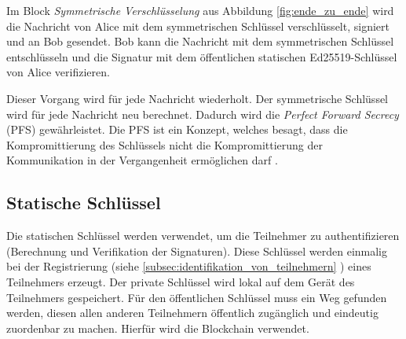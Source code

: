 Im Block \textit{Symmetrische Verschlüsselung} aus Abbildung \ref{fig:ende_zu_ende} wird die Nachricht von Alice mit dem symmetrischen Schlüssel verschlüsselt, signiert und an Bob gesendet. Bob kann die Nachricht mit dem symmetrischen Schlüssel entschlüsseln und die Signatur mit dem öffentlichen statischen Ed25519-Schlüssel von Alice verifizieren.

Dieser Vorgang wird für jede Nachricht wiederholt. Der symmetrische Schlüssel wird für jede Nachricht neu berechnet. Dadurch wird die \textit{Perfect Forward Secrecy} (PFS) gewährleistet. Die PFS ist ein Konzept, welches besagt, dass die Kompromittierung des Schlüssels nicht die Kompromittierung der Kommunikation in der Vergangenheit ermöglichen darf \parencite[S. 921-922]{Krawczyk_PerfectForwardSecrecy}.


\subsection{Statische Schlüssel}

Die statischen Schlüssel werden verwendet, um die Teilnehmer zu authentifizieren (Berechnung und Verifikation der Signaturen). Diese Schlüssel werden einmalig bei der Registrierung (siehe \ref{subsec:identifikation_von_teilnehmern} \textit{}) eines Teilnehmers erzeugt. Der private Schlüssel wird lokal auf dem Gerät des Teilnehmers gespeichert. Für den öffentlichen Schlüssel muss ein Weg gefunden werden, diesen allen anderen Teilnehmern öffentlich zugänglich und eindeutig zuordenbar zu machen. Hierfür wird die Blockchain verwendet. 


